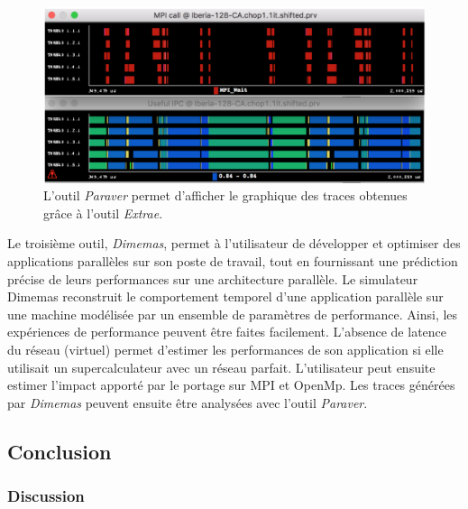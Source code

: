         \begin{figure}
        \center
        \includegraphics[width=12cm]{images/edl_perf_paraver.png}
        \caption{\label{fig:edl_perf_paraver} L'outil \textit{Paraver} permet d'afficher le graphique des traces obtenues grâce à l'outil \textit{Extrae}.}
        \end{figure}
        
        Le troisième outil, \textit{Dimemas}, permet à l'utilisateur de développer et optimiser des applications parallèles sur son poste de travail, tout en fournissant une prédiction précise de leurs performances sur une architecture parallèle. Le simulateur Dimemas reconstruit le comportement temporel d'une application parallèle sur une machine modélisée par un ensemble de paramètres de performance. Ainsi, les expériences de performance peuvent être faites facilement. L'absence de latence du réseau (virtuel) permet d'estimer les performances de son application si elle utilisait un supercalculateur avec un réseau parfait. L'utilisateur peut ensuite estimer l'impact apporté par le portage sur MPI et OpenMp. Les traces générées par \textit{Dimemas} peuvent ensuite être analysées avec l'outil \textit{Paraver}.



\subsection{Conclusion}\label{sec:edl_hc_conclusion}
    
    \subsubsection{Discussion}
    
